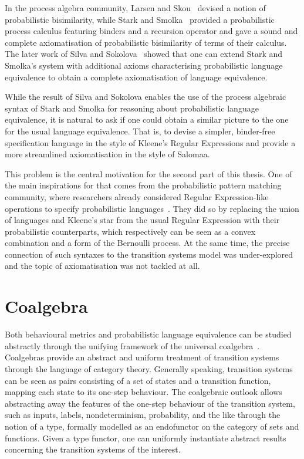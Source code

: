 In the process algebra community, Larsen and Skou~\cite{Larsen:1991:Bisimulation} devised a notion of probabilistic bisimilarity, while Stark and Smolka~\cite{Stark:2000:Complete} provided a probabilistic process calculus featuring binders and a recursion operator and gave a sound and complete axiomatisation of probabilistic bisimilarity of terms of their calculus. The later work of Silva and Sokolova~\cite{Silva:2011:Sound} showed that one can extend Stark and Smolka's system with additional axioms characterising probabilistic language equivalence to obtain a complete axiomatisation of language equivalence.

While the result of Silva and Sokolova enables the use of the process algebraic syntax of Stark and Smolka for reasoning about probabilistic language equivalence, it is natural to ask if one could obtain a similar picture to the one for the usual language equivalence. That is, to devise a simpler, binder-free specification language in the style of Kleene's Regular Expressions and provide a more streamlined axiomatisation in the style of Salomaa.
	
	This problem is the central motivation for the second part of this thesis. One of the main inspirations for that comes from the probabilistic pattern matching community, where researchers already considered Regular Expression-like operations to specify probabilistic languages~\cite{Ross:2000:Probabilistic}. They did so by replacing the union of languages and Kleene's star from the usual Regular Expression with their probabilistic counterparts, which respectively can be seen as a convex combination and a form of the Bernoulli process. At the same time, the precise connection of such syntaxes to the transition systems model was under-explored~\cite{Beeh:2017:Transformations} and the topic of axiomatisation was not tackled at all. 


\section{Coalgebra}
Both behavioural metrics and probabilistic language equivalence can be studied abstractly through the unifying framework of the universal coalgebra~\cite{Gumm:2000:Elements,Rutten:2000:Universal}. Coalgebras provide an abstract and uniform treatment of transition systems through the language of category theory. Generally speaking, transition systems can be seen as pairs consisting of a set of states and a transition function, mapping each state to its one-step behaviour. The coalgebraic outlook allows abstracting away the features of the one-step behaviour of the transition system, such as inputs, labels, nondeterminism, probability, and the like through the notion of a type, formally modelled as an endofunctor on the category of sets and functions. Given a type functor, one can uniformly instantiate abstract results concerning the transition systems of the interest. 


